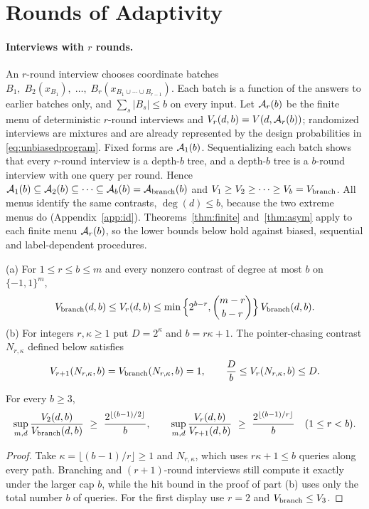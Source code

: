 \section{Rounds of Adaptivity}\label{app:roundshier}
\paragraph{Interviews with $r$ rounds.}
An $r$-round interview chooses coordinate batches
$B_1,\;B_2(x_{B_1}),\;\ldots,\;B_r(x_{B_1\cup\cdots\cup B_{r-1}})$.
Each batch is a function of the answers to earlier batches only, and
$\sum_s|B_s|\le b$ on every input. Let $\mathcal A_r(b)$ be the finite menu of
deterministic $r$-round interviews and $V_r(d,b)=V(d,\mathcal A_r(b))$; randomized
interviews are mixtures and are already represented by the design
probabilities in \eqref{eq:unbiasedprogram}. Fixed forms are $\mathcal A_1(b)$.
Sequentializing each batch shows that every $r$-round interview is a depth-$b$
tree, and a depth-$b$ tree is a $b$-round interview with one query per round.
Hence $\mathcal A_1(b)\subseteq\mathcal A_2(b)\subseteq\cdots\subseteq\mathcal A_b(b)=\mathcal A_{\rm branch}(b)$
and $V_1\ge V_2\ge\cdots\ge V_b=V_{\rm branch}$. All menus identify the same
contrasts, $\deg(d)\le b$, because the two extreme menus do
(Appendix~\ref{app:id}). Theorems~\ref{thm:finite} and~\ref{thm:asym} apply to
each finite menu $\mathcal A_r(b)$, so the lower bounds below hold against biased,
sequential and label-dependent procedures.

\begin{theorem}\label{thm:roundsfull}
\textup{(a)} For $1\le r\le b\le m$ and every nonzero contrast of degree at most $b$ on $\{-1,1\}^m$,
\[
 V_{\rm branch}(d,b)\le V_r(d,b)\le
 \min\Big\{2^{b-r},\binom{m-r}{b-r}\Big\}\,V_{\rm branch}(d,b).
\]
\textup{(b)} For integers $r,\kappa\ge1$ put $D=2^\kappa$ and $b=r\kappa+1$.
The pointer-chasing contrast $N_{r,\kappa}$ defined below satisfies
\[
 V_{r+1}(N_{r,\kappa},b)=V_{\rm branch}(N_{r,\kappa},b)=1,\qquad
 \frac{D}{b}\le V_r(N_{r,\kappa},b)\le D.
\]
\end{theorem}

\begin{corollary}\label{cor:tworounds}
For every $b\ge3$,
\[
 \sup_{m,d}\frac{V_2(d,b)}{V_{\rm branch}(d,b)}\ \ge\ \frac{2^{\lfloor(b-1)/2\rfloor}}{b},
 \qquad
 \sup_{m,d}\frac{V_r(d,b)}{V_{r+1}(d,b)}\ \ge\ \frac{2^{\lfloor(b-1)/r\rfloor}}{b}
 \quad(1\le r<b).
\]
\end{corollary}
\begin{proof}
Take $\kappa=\lfloor(b-1)/r\rfloor\ge1$ and $N_{r,\kappa}$, which uses
$r\kappa+1\le b$ queries along every path. Branching and $(r+1)$-round
interviews still compute it exactly under the larger cap $b$, while the hit
bound in the proof of part (b) uses only the total number $b$ of queries.
For the first display use $r=2$ and $V_{\rm branch}\le V_3$.
\end{proof}

